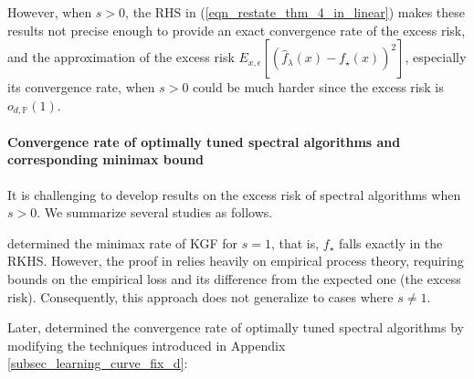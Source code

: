 \documentclass{article}
\theoremstyle{plain}
\theoremstyle{definition}
\theoremstyle{remark}
\begin{document}
\begin{appendix}
However, when \( s > 0 \), the RHS in (\ref{eqn_restate_thm_4_in_linear}) makes these results not precise enough to provide an exact convergence rate of the excess risk, and the approximation of the excess risk $E_{x, \epsilon} [ (\hat{f}_{\lambda}(x) - f_{\star}(x) )^{2} ]$, especially its convergence rate, when $s>0$ could be much harder since the excess risk is $o_{d, \mathbb{P}}(1)$.






\paragraph*{Convergence rate of optimally tuned spectral algorithms and corresponding minimax bound}

It is challenging to develop results on the excess risk of spectral algorithms when $s>0$. We summarize several studies as follows.


\cite{lu2023optimal} determined the minimax rate of KGF for $s=1$, that is, $f_{\star}$ falls exactly in the RKHS. However, the proof in \cite{lu2023optimal} relies heavily on empirical process theory, requiring bounds on the empirical loss and its difference from the expected one (the excess risk). Consequently, this approach does not generalize to cases where $s\neq 1$.


Later, \cite{zhang2024optimal, lu2024saturation, zhang2025learning} determined the convergence rate of optimally tuned spectral algorithms by modifying the techniques introduced in Appendix \ref{subsec_learning_curve_fix_d}:



\end{appendix}
\end{document}
